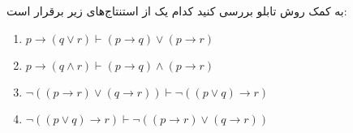 به کمک روش تابلو بررسی کنید کدام یک از استنتاج‌های زیر برقرار است:
\begin{enumerate}
  \item $p \rightarrow (q \vee r) \vdash (p \rightarrow q) \vee (p \rightarrow r)$
  \item $p \rightarrow (q \wedge r) \vdash (p \rightarrow q) \wedge (p \rightarrow r)$
  \item $\neg ((p \rightarrow r) \vee (q \rightarrow r)) \vdash \neg ((p \vee q) \rightarrow r)$
  \item $\neg ((p \vee q) \rightarrow r) \vdash \neg ((p \rightarrow r) \vee (q \rightarrow r))$
\end{enumerate}